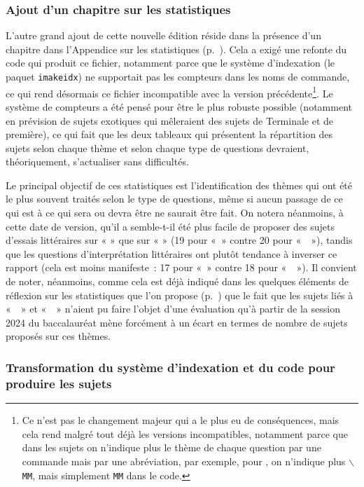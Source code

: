 \subsubsection{Ajout d'un chapitre sur les statistiques}

L'autre grand ajout de cette nouvelle édition réside dans la présence d'un chapitre dans l'Appendice sur les statistiques (p.~\pageref{statistiques}). Cela a exigé une refonte du code qui produit ce fichier, notamment parce que le système d'indexation (le paquet \texttt{imakeidx}) ne supportait pas les compteurs dans les noms de commande, ce qui rend désormais ce fichier incompatible avec la version précédente\footnote{Ce n'est pas le changement majeur qui a le plus eu de conséquences, mais cela rend malgré tout déjà les versions incompatibles, notamment parce que dans les sujets on n'indique plus le thème de chaque question par une commande mais par une abréviation, par exemple, pour \MM{}, on n'indique plus \texttt{$\backslash$MM}, mais simplement \texttt{MM} dans le code.}. Le système de compteurs a été pensé pour être le plus robuste possible (notamment en prévision de sujets exotiques qui mêleraient des sujets de Terminale et de première), ce qui fait que les deux tableaux qui présentent la répartition des sujets selon chaque thème et selon chaque type de questions devraient, théoriquement, s'actualiser sans difficultés.

Le principal objectif de ces statistiques est l'identification des thèmes qui ont été le plus souvent traités selon le type de questions, même si aucun passage de ce qui est à ce qui sera ou devra être ne saurait être fait. On notera néanmoins, à cette date de version, qu'il a semble-t-il été plus facile de proposer des sujets d'essais littéraires sur « \MM{}»{} que sur « \EXS{}»{} (19 pour «~\MM{}»{} contre 20 pour «~\EXS~»{}), tandis que les questions d'interprétation littéraires ont plutôt tendance à inverser ce rapport (cela est moins manifeste~: 17 pour «~\MM{}»{} contre 18 pour «~\EXS~»{}). Il convient de noter, néanmoins, comme cela est déjà indiqué dans les quelques éléments de réflexion sur les statistiques que l'on propose (p.~\pageref{statistiques}) que le fait que les sujets liés à «~\ETA~»{} et «~\CC~»{} n'aient pu faire l'objet d'une évaluation qu'à partir de la session 2024 du baccalauréat mène forcément à un écart en termes de nombre de sujets proposés sur ces thèmes.

\subsubsection{Transformation du système d'indexation et du code pour produire les sujets}


